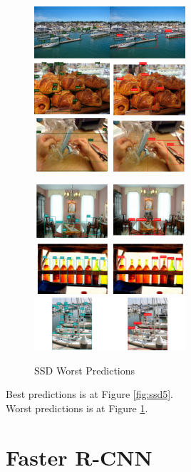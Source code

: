 \documentclass[12pt]{article}
\begin{document}
\begin{figure}[htbp]
    {\raggedright
    \includegraphics[width=0.5\textwidth]{images/ssd_res/ssd_w1.png}
    \includegraphics[width=0.5\textwidth]{images/ssd_res/ssd_w2.png}
    \includegraphics[width=0.5\textwidth]{images/ssd_res/ssd_w3.png}}
    {\raggedleft
    \includegraphics[width=0.5\textwidth]{images/ssd_res/ssd_w4.png}
    \includegraphics[width=0.5\textwidth]{images/ssd_res/ssd_w5.png}
    \includegraphics[width=0.5\textwidth]{images/ssd_res/ssd_w6.png}}
    \caption{SSD Worst Predictions}
    \label{fig:ssd6}
\end{figure}

Best predictions is at Figure \ref{fig:ssd5}.
\\
Worst predictions is at Figure \ref{fig:ssd6}.

\section{Faster R-CNN}
\end{document}

